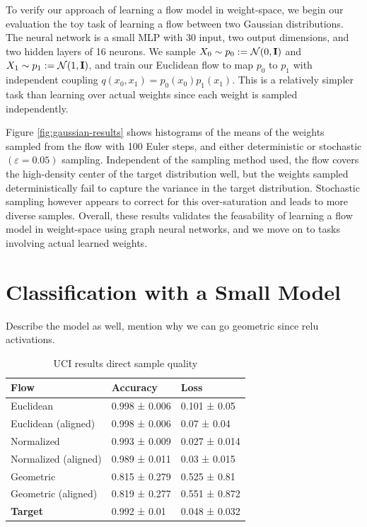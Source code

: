To verify our approach of learning a flow model in weight-space, we begin our evaluation the toy task of learning a flow between two Gaussian distributions. The neural network is a small MLP with 30 input, two output dimensions, and two hidden layers of 16 neurons. We sample $X_0 \sim p_0 := \mathcal{N}(0, \mathbf{I})$ and $X_1 \sim p_1 := \mathcal{N}(1, \mathbf{I})$, and train our Euclidean flow to map $p_0$ to $p_1$ with independent coupling $q(x_0, x_1) = p_0(x_0)p_1(x_1)$. This is a relatively simpler task than learning over actual weights since each weight is sampled independently. 

Figure \ref{fig:gaussian-results} shows histograms of the means of the weights sampled from the flow with 100 Euler steps, and either deterministic or stochastic $(\varepsilon=0.05)$ sampling. Independent of the sampling method used, the flow covers the high-density center of the target distribution well, but the weights sampled deterministically fail to capture the variance in the target distribution. Stochastic sampling however appears to correct for this over-saturation and leads to more diverse samples. Overall, these results validates the feasability of learning a flow model in weight-space using graph neural networks, and we move on to tasks involving actual learned weights. 


\section{Classification with a Small Model}

Describe the model as well, mention why we can go geometric since relu activations. 

\begin{table}[h!]
    \centering
    \begin{tabular}{lll}
        \toprule
        \textbf{Flow}  & \textbf{Accuracy} & \textbf{Loss} \\
        \midrule
        Euclidean  & 0.998 ± 0.006 & 0.101 ± 0.05 \\ 
        Euclidean (aligned)  & 0.998 ± 0.006 & 0.07 ± 0.04 \\
        \midrule
        Normalized  & 0.993 ± 0.009 & 0.027 ± 0.014 \\
        Normalized (aligned)  & 0.989 ± 0.011 & 0.03 ± 0.015 \\
        \midrule
        Geometric  & 0.815 ± 0.279 & 0.525 ± 0.81 \\
        Geometric (aligned)  & 0.819 ± 0.277 & 0.551 ± 0.872 \\
        \midrule
        \textbf{Target} & 0.992 ± 0.01 & 0.048 ± 0.032 \\
        \bottomrule
    \end{tabular}
    \caption{\label{tab:uci_class_table}UCI results direct sample quality}
\end{table}

